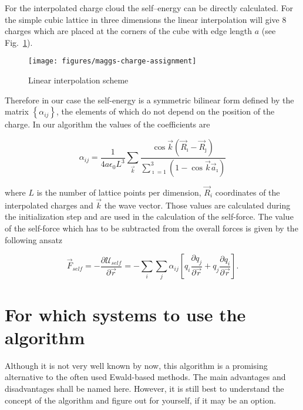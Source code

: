 For the interpolated charge cloud the self--energy can be directly
calculated. For the simple cubic lattice in three dimensions the
linear interpolation will give 8 charges which are placed at the
corners of the cube with edge length $a$ (see
Fig.~\ref{fig:charge-assignment}).

\begin{figure}[ht]
  \centering
  \texttt{[image: figures/maggs-charge-assignment]}
  \caption{Linear interpolation scheme} 
  \label{fig:charge-assignment}  
\end{figure}

Therefore in our case the self-energy is a symmetric bilinear form
defined by the matrix $\left\{\alpha_{ij}\right\}$, the elements of
which do not depend on the position of the charge. In our algorithm
the values of the coefficients are

\begin{equation}
  \alpha_{ij}=\frac{1}{4a\epsilon_0L^3}\sum\limits_{\vec k}
  \frac{\cos \vec k(\vec R_{\imath}-\vec R_{\jmath})}
  {\sum_{\imath=1}^3(1-\cos\vec k\vec a_{\imath})}
\end{equation}

where $L$ is the number of lattice points per dimension, $\vec R_i$
coordinates of the interpolated charges and $\vec k$ the wave vector.
Those values are calculated during the initialization step and are
used in the calculation of the self-force. The value of the self-force
which has to be subtracted from the overall forces is given by the
following ansatz

\begin{equation}
  \vec F_{self}=-\frac{\partial \mathcal U_{self}}{\partial\vec r}
  =-\sum\limits_i\sum\limits_j\alpha_{ij}
  \left[q_i\frac{\partial q_j}{\partial\vec r}
    +q_j\frac{\partial q_i}{\partial\vec r}\right].
\end{equation}

\section{For which systems to use the algorithm}

Although it is not very well known by now, this algorithm is a
promising alternative to the often used Ewald-based methods. The main
advantages and disadvantages shall be named here. However, it is still
best to understand the concept of the algorithm and figure out for
yourself, if it may be an option.

